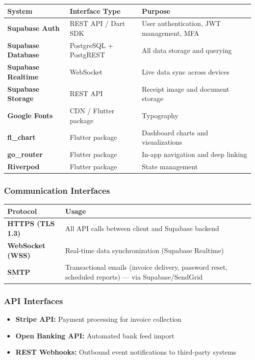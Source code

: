 \documentclass[journal, a4paper, onecolumn, 12pt]{IEEEtran}
\begin{document}
\begin{longtable}{|p{}|p{}|p{}|}
\hline
System & Interface Type & Purpose \\ \hline
\hline
\textbf{Supabase Auth} & REST API / Dart SDK & User authentication, JWT management, MFA \\ \hline
\textbf{Supabase Database} & PostgreSQL + PostgREST & All data storage and querying \\ \hline
\textbf{Supabase Realtime} & WebSocket & Live data sync across devices \\ \hline
\textbf{Supabase Storage} & REST API & Receipt image and document storage \\ \hline
\textbf{Google Fonts} & CDN / Flutter package & Typography \\ \hline
\textbf{fl\_chart} & Flutter package & Dashboard charts and visualizations \\ \hline
\textbf{go\_router} & Flutter package & In-app navigation and deep linking \\ \hline
\textbf{Riverpod} & Flutter package & State management \\ \hline
\end{longtable}
\subsubsection{Communication Interfaces}

\begin{longtable}{|p{}|p{}|}
\hline
Protocol & Usage \\ \hline
\hline
\textbf{HTTPS (TLS 1.3)} & All API calls between client and Supabase backend \\ \hline
\textbf{WebSocket (WSS)} & Real-time data synchronization (Supabase Realtime) \\ \hline
\textbf{SMTP} & Transactional emails (invoice delivery, password reset, scheduled reports) — via Supabase/SendGrid \\ \hline
\end{longtable}
\subsubsection{API Interfaces}
\begin{itemize}[leftmargin=*]
\item \textbf{Stripe API:} Payment processing for invoice collection
\item \textbf{Open Banking API:} Automated bank feed import
\item \textbf{REST Webhooks:} Outbound event notifications to third-party systems
\end{itemize}
\end{document}
